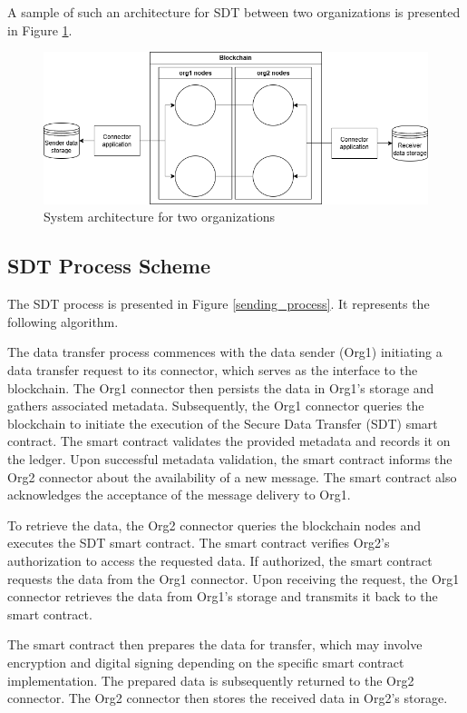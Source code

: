 \documentclass[10pt]{llncs}
\begin{document}
A sample of such an architecture for SDT between two organizations is presented in Figure \ref{system_architecture}.

\begin{figure}
    \includegraphics[width=\textwidth]{system_architecture.png}
    \caption{System architecture for two organizations} \label{system_architecture}
\end{figure}

\subsection{SDT Process Scheme}

The SDT process is presented in Figure \ref{sending_process}.
It represents the following algorithm.

The data transfer process commences with the data sender (Org1) initiating a data transfer request to its connector, which serves as the interface to the blockchain. 
The Org1 connector then persists the data in Org1's storage and gathers associated metadata. 
Subsequently, the Org1 connector queries the blockchain to initiate the execution of the Secure Data Transfer (SDT) smart contract. 
The smart contract validates the provided metadata and records it on the ledger. 
Upon successful metadata validation, the smart contract informs the Org2 connector about the availability of a new message. 
The smart contract also acknowledges the acceptance of the message delivery to Org1.

To retrieve the data, the Org2 connector queries the blockchain nodes and executes the SDT smart contract. 
The smart contract verifies Org2's authorization to access the requested data. 
If authorized, the smart contract requests the data from the Org1 connector. 
Upon receiving the request, the Org1 connector retrieves the data from Org1's storage and transmits it back to the smart contract.

The smart contract then prepares the data for transfer, which may involve encryption and digital signing depending on the specific smart contract implementation. 
The prepared data is subsequently returned to the Org2 connector. The Org2 connector then stores the received data in Org2's storage.
\end{document}
